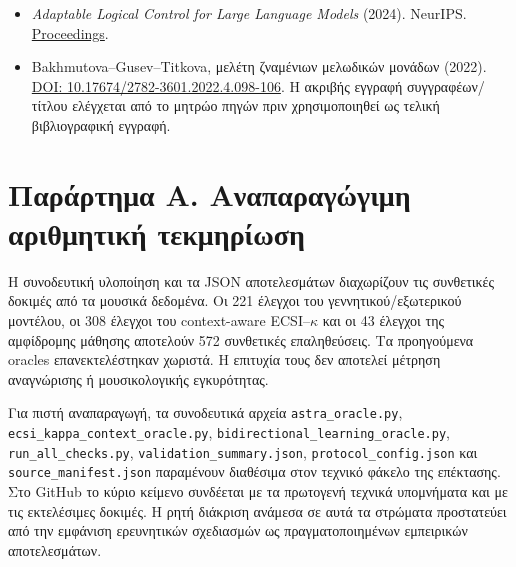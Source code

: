 \documentclass[
  10pt,
  a4paper,
]{report}
\begin{document}
\begin{itemize}
  De Smet, L. et al.~(2025). \emph{Relational Neurosymbolic Markov
  Models}. AAAI.
  \href{https://ojs.aaai.org/index.php/AAAI/article/view/33777}{Official
  venue}.
\item
  \emph{Adaptable Logical Control for Large Language Models} (2024).
  NeurIPS. \href{https://arxiv.org/html/2406.13892v2}{Proceedings}.
\item
  Bakhmutova--Gusev--Titkova, μελέτη ζναμένιων μελωδικών μονάδων (2022).
  \href{https://doi.org/10.17674/2782-3601.2022.4.098-106}{DOI:
  10.17674/2782-3601.2022.4.098-106}. Η ακριβής εγγραφή
  συγγραφέων/τίτλου ελέγχεται από το μητρώο πηγών πριν χρησιμοποιηθεί ως
  τελική βιβλιογραφική εγγραφή.
\end{itemize}

\chapter{Παράρτημα Α. Αναπαραγώγιμη αριθμητική
τεκμηρίωση}\label{ux3c0ux3b1ux3c1ux3acux3c1ux3c4ux3b7ux3bcux3b1-ux3b1.-ux3b1ux3bdux3b1ux3c0ux3b1ux3c1ux3b1ux3b3ux3ceux3b3ux3b9ux3bcux3b7-ux3b1ux3c1ux3b9ux3b8ux3bcux3b7ux3c4ux3b9ux3baux3ae-ux3c4ux3b5ux3baux3bcux3b7ux3c1ux3afux3c9ux3c3ux3b7}

Η συνοδευτική υλοποίηση και τα JSON αποτελεσμάτων διαχωρίζουν τις
συνθετικές δοκιμές από τα μουσικά δεδομένα. Οι 221 έλεγχοι του
γεννητικού/εξωτερικού μοντέλου, οι 308 έλεγχοι του context-aware
ECSI--\(\kappa\) και οι 43 έλεγχοι της αμφίδρομης μάθησης αποτελούν 572
συνθετικές επαληθεύσεις. Τα προηγούμενα oracles επανεκτελέστηκαν
χωριστά. Η επιτυχία τους δεν αποτελεί μέτρηση αναγνώρισης ή
μουσικολογικής εγκυρότητας.

Για πιστή αναπαραγωγή, τα συνοδευτικά αρχεία \texttt{astra\_oracle.py},
\texttt{ecsi\_kappa\_context\_oracle.py},
\texttt{bidirectional\_learning\_oracle.py},
\texttt{run\_all\_checks.py}, \texttt{validation\_summary.json},
\texttt{protocol\_config.json} και \texttt{source\_manifest.json}
παραμένουν διαθέσιμα στον τεχνικό φάκελο της επέκτασης. Στο GitHub το
κύριο κείμενο συνδέεται με τα πρωτογενή τεχνικά υπομνήματα και με τις
εκτελέσιμες δοκιμές. Η ρητή διάκριση ανάμεσα σε αυτά τα στρώματα
προστατεύει από την εμφάνιση ερευνητικών σχεδιασμών ως πραγματοποιημένων
εμπειρικών αποτελεσμάτων.
\end{document}
